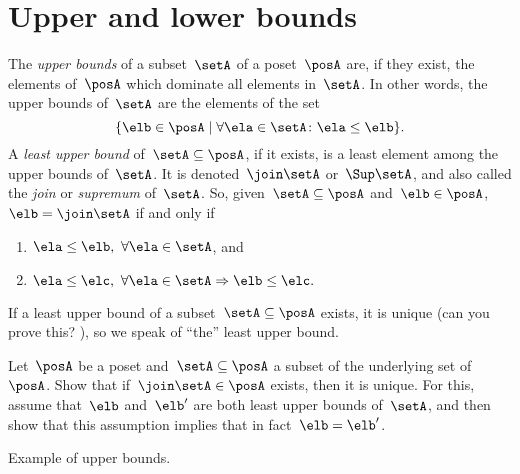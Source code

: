 \section{Upper and lower bounds}
\begin{ctdefinition}
    \label{def:least-upper-bound}
    The \emph{upper bounds} of a subset~$\setA$ of a poset~$\posA$ are, if they exist, the elements of~$\posA$ which dominate all elements in~$\setA$.
    In other words, the upper bounds of~$\setA$ are the elements of the set
    \begin{equation*}
        \{ \elb \in \posA \mid \forall \ela \in \setA  \colon \ela \leq \elb \}.
    \end{equation*}
    A \emph{least upper bound} of~$\setA \subseteq \posA$, if it exists, is a least element among the upper bounds of~$\setA$.
    It is denoted~$\join \setA$ or~$\Sup\setA$, and also called the \emph{join} or \emph{supremum} of~$\setA$.
    So, given~$\setA \subseteq \posA$ and~$\elb \in \posA$,~$\elb =  \join \setA$ if and only if
    \begin{enumerate}
        \item $\ela \leq \elb, \ \forall \ela \in \setA$, and
        \item $\ela \leq \elc, \ \forall \ela \in \setA \Rightarrow \elb \leq \elc.
              $
    \end{enumerate}
    If a least upper bound of a subset~$\setA \subseteq \posA$ exists, it is unique (can you prove this?
    ), so we speak of ``the'' least upper bound.
\end{ctdefinition}

\begin{exercise}
    Let~$\posA$ be a poset and~$\setA \subseteq \posA$ a subset of the underlying set of~$\posA$.
    Show that if~$\join \setA \in \posA$ exists, then it is unique.
    For this, assume that~$\elb$ and~$\elb'$ are both least upper bounds of~$\setA$, and then show that this assumption implies that in fact~$\elb = \elb'$.
\end{exercise}
\begin{solution}
    \missingsolution
\end{solution}

\begin{marginfigure}
    \centering
    \caption{Example of upper bounds. }
    \label{fig:upper_bound_example}
\end{marginfigure}

